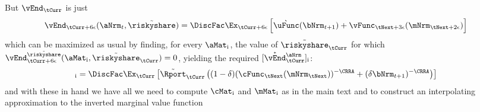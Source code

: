 \documentclass[./SolvingMicroDSOPs_TRP]{subfiles}
\begin{document}
{But $\vEnd_{\tCurr}$ is just 
\begin{align}
  \vEnd_{\tCurr+\definevEnd}(\aNrm_{t},\Rend{\riskyshare}) & = \DiscFac \Ex_{\tCurr+\definevEnd}\left[\uFromB(\bNrm_{t+1})+\vFunc_{\tNext+\choosecons}(\mNrm_{\tNext+\calculatem})\right]
\end{align}
which can be maximized as usual by finding, for every $\aMat_{\aIdx}$, the value of $\Rend{\riskyshare}_{\tCurr}$ for which $\vEnd_{\tCurr+\definevEnd}^{\Rend{\riskyshare}}(\aMat_{\aIdx},\Rend{\riskyshare}_{\tCurr}) = 0$, yielding  the required $[\Maxed{\vEnd}_{\tCurr}^{\aNrm}]_{\aIdx}$:
\begin{align}
  [\Maxed{\vEnd}_{\tCurr}^{\aNrm}]_{\aIdx} & = \DiscFac \Ex_{\tCurr}\left[\Rend{\Rport}_{\tCurr}\left((1-\wealthU)(\cFunc_{\tNext}(\mNrm_{\tNext}))^{-\CRRA}+(\wealthU \bNrm_{t+1})^{-\CRRA}\right)
                                        \right]
\end{align}
and with these in hand we have all we need to compute $\cMat_{\aIdx}$ and $\mMat_{\aIdx}$ as in the main text and to construct an interpolating approximation to the inverted marginal value function 

}{} %
\end{document}
